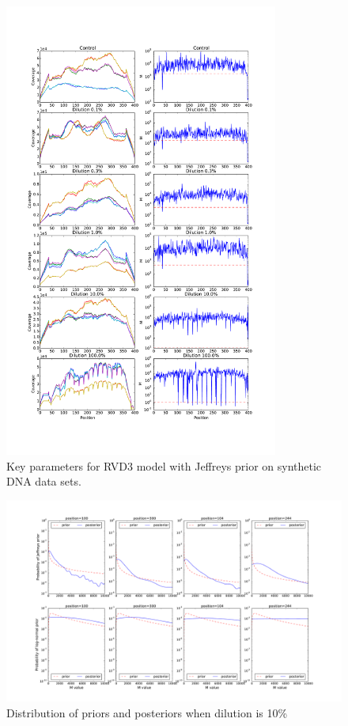 \documentclass{bioinfo}
\begin{document}
\begin{figure}[htbp]
\begin{center}
\includegraphics[width=90mm]{figs/M_jeffrey.pdf}
\caption{Key parameters for RVD3 model with Jeffreys prior on synthetic DNA data sets.}
\label{fig:M_jeffrey}
\end{center}
\end{figure}

\begin{figure}[!tbp]
\begin{center}
\includegraphics[width=190mm]{figs/post_prior_dilu_10.pdf}
\caption{Distribution of priors and posteriors when dilution is 10\%}
\label{fig:dilu_10}
\end{center}
\end{figure}
\end{document}
